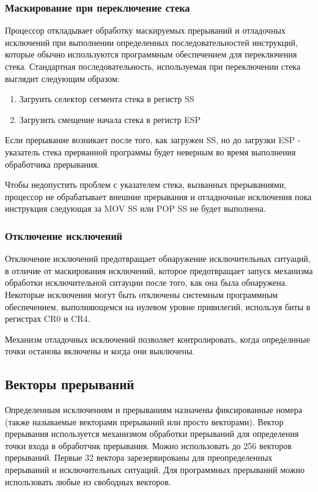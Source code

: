 \subsubsection*{Маскирование при переключение стека}
Процессор откладывает обработку маскируемых прерываний и отладочных исключений
при выполнении определенных последовательностей инструкций, которые обычно
используются программным обеспечением для переключения стека. Стандартная
последовательность, используемая при переключении стека выглядит следующим
образом:
\begin{enumerate}
\item Загруить селектор сегмента стека в регистр SS
\item Загрузить смещение начала стека в регистр ESP
\end{enumerate}

Если прерывание возникает после того, как загружен SS, но до загрузки ESP -
указатель стека прерванной программы будет неверным во время выполнения
обработчика прерывания.

Чтобы недопустить проблем с указателем стека, вызванных прерываниями,
процессор не обрабатывает внешние прерывания и отладночные исключения пока
инструкция следующая за MOV SS или POP SS не будет выполнена.

\subsubsection*{Отключение исключений}
Отключение исключений предотвращает обнаружение исключительных ситуаций, в
отличие от маскирования исключений, которое предотвращает запуск механизма
обработки исключительной ситауции после того, как она была обнаружена.
Некоторые исключения могут быть отключены системным программным обеспечением,
выполняющемся на нулевом уровне привилегий, используя биты в регистрах CR0 и
CR4.

Механизм отладочных исключений позволяет контролировать, когда определнные
точки останова включены и когда они выключены.

\subsection{Векторы прерываний}
Определенным исключениям и прерываниям назначены фиксированные номера (также
называемые векторами прерываний или просто векторами). Вектор прерывания
используется механизмом обработки прерываний для определения точки входа в
обработчик прерывания. Можно использовать до 256 векторов прерываний. Первые 32 вектора
зарезервированы для преопределенных прерываний и исключительных ситуаций.
Для программных прерываний можно использовать любые из свободных векторов.

